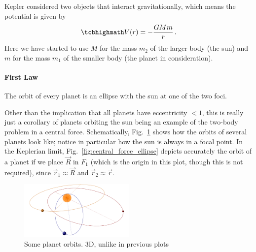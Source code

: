\documentclass[../class_mech_main.tex]{subfiles}
\begin{document}
Kepler considered two objects that interact gravitationally, which means the potential is given by
\begin{equation}
	\eqbox{
		V(r) = - \frac{G M m}{r}
	}
	\, .
\end{equation}
Here we have started to use $M$ for the mass $m_2$ of the larger body (the sun) and $m$ for the mass $m_1$ of the smaller body (the planet in consideration).







			\paragraph{First Law}

\begin{center}
	The orbit of every planet is an ellipse with the sun at one of the two foci.
\end{center}



Other than the implication that all planets have eccentricity $< 1$, this is really just a corollary of planets orbiting the sun being an example of the two-body problem in a central force. Schematically, Fig.~\ref{fig:kepler_orbits} shows how the orbits of several planets look like; notice in particular how the sun is always in a focal point. In the Keplerian limit, Fig.~\ref{fig:central_force_ellipse} depicts accurately the orbit of a planet if we place $\vec{R}$ in $F_1$ (which is the origin in this plot, though this is not required), since $\vec{r}_1 \approx \vec{R}$ and $\vec{r}_2 \approx \vec{r}$.



\begin{figure}
	\centering

	\includegraphics[width=0.5\textwidth]{pictures/central_force_planets.pdf}

	\caption{Some planet orbits. 3D, unlike in previous plots}
	\label{fig:kepler_orbits}
\end{figure}
\end{document}
